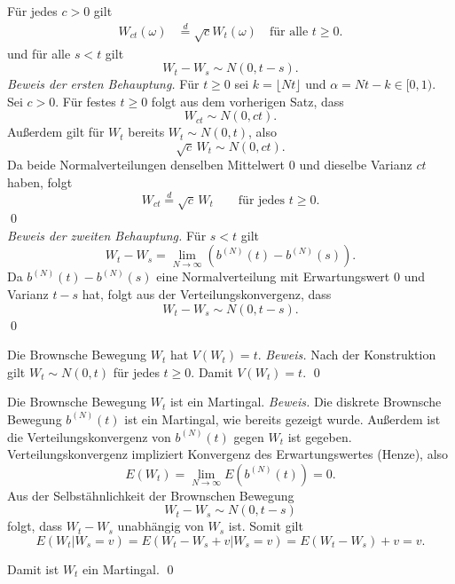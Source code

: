 \begin{lemma}
Für jedes $c > 0$ gilt
$$
\begin{aligned}
W_{ct}(\omega) &\stackrel{d}{=} \sqrt{c} W_t(\omega) \quad \text{für alle } t \ge 0.
\end{aligned}
$$
und für alle $s \lt t$ gilt
$$
W_t - W_s \sim N(0, t-s).
$$
\textit{Beweis der ersten Behauptung.}
Für $t \ge 0$ sei $k = \lfloor Nt \rfloor$ und $\alpha = Nt - k \in [0,1)$.
Sei $c>0$. Für festes $t\ge0$ folgt aus dem vorherigen Satz, dass
$$W_{ct}\sim N(0,ct).$$
Außerdem gilt für $W_t$ bereits $W_t\sim N(0,t)$, also
$$\sqrt{c}\,W_t\sim N(0,c t).$$
Da beide Normalverteilungen denselben Mittelwert $0$ und dieselbe Varianz $ct$ haben, folgt
$$W_{ct}\stackrel{d}{=}\sqrt{c}\,W_t\qquad\text{für jedes }t\ge0.$$
\qed \\
\textit{Beweis der zweiten Behauptung.}
Für $s < t$ gilt
$$
W_t - W_s = \lim_{N \to \infty} \left( b^{(N)}(t) - b^{(N)}(s) \right).
$$
Da $b^{(N)}(t) - b^{(N)}(s)$ eine Normalverteilung mit Erwartungswert $0$ und Varianz $t-s$ hat, folgt aus der Verteilungskonvergenz, dass
$$
W_t - W_s \sim N(0, t-s).
$$
\qed

\end{lemma}

\begin{satz}
Die Brownsche Bewegung $W_t$ hat $V(W_t)=t$.
\textit{Beweis.} Nach der Konstruktion gilt $W_t\sim N(0,t)$ für jedes $t\ge0$.
Damit $V(W_t)=t$. \qed
\end{satz}

\begin{satz}
Die Brownsche Bewegung $W_t$ ist ein Martingal.
\textit{Beweis.}
Die diskrete Brownsche Bewegung $b^{(N)}(t)$ ist ein Martingal, wie bereits gezeigt wurde.
Außerdem ist die Verteilungskonvergenz von $b^{(N)}(t)$ gegen $W_t$ ist gegeben.
Verteilungskonvergenz impliziert Konvergenz des Erwartungswertes (Henze), also
$$
E(W_t) = \lim_{N \to \infty} E(b^{(N)}(t)) = 0.
$$
Aus der Selbstähnlichkeit der Brownschen Bewegung $$W_t - W_s \sim N(0, t-s)$$
folgt, dass $W_t - W_s$ unabhängig von $W_s$ ist. Somit gilt
$$
E(W_t | W_s = v) = E(W_t - W_s + v | W_s = v) = E(W_t - W_s) + v = v.
$$

Damit ist $W_t$ ein Martingal. \qed
\end{satz}